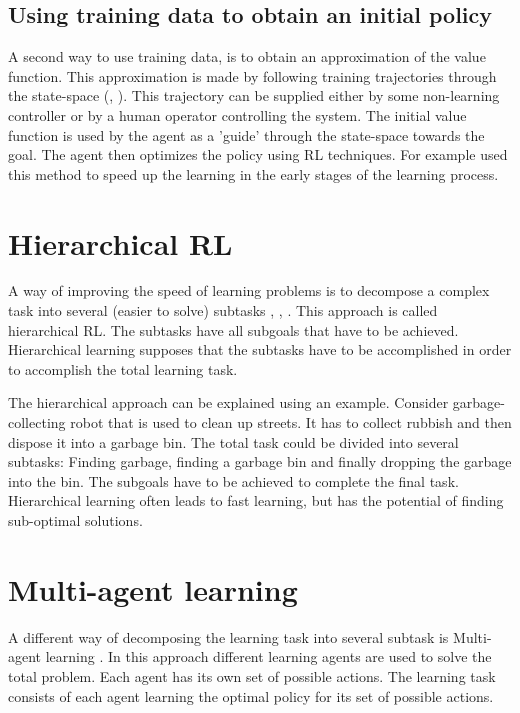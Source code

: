 \documentclass[a4paper,11pt]{mscLiterature}
\begin{document}
\subsection{Using training data to obtain an initial policy}
A second way to use training data, is to obtain an approximation of the value function. This approximation is made by following training trajectories through the state-space (\cite{AtkesonSchaal:97}, \cite{SmartKaelbling:00}). This trajectory can be supplied either by some non-learning controller or by a human operator controlling the system. The initial value function is used by the agent as a 'guide' through the state-space towards the goal. The agent then optimizes the policy using RL techniques. For example \cite{SmartKaelbling:00} used this method to speed up the learning in the early stages of the learning process.


\section{Hierarchical RL}
A way of improving the speed of learning problems is to decompose a complex task into several (easier to solve) subtasks \cite{Kaelbling:96}, \cite{BakkerSchmidhuber:04}, \cite{Schuitema:06}. This approach is called hierarchical RL. The subtasks have all subgoals that have to be achieved. Hierarchical learning supposes that the subtasks have to be accomplished in order to accomplish the total learning task. 

The hierarchical approach can be explained using an example. Consider garbage-collecting robot that is used to clean up streets. It has to collect rubbish and then dispose it into a garbage bin. The total task could be divided into several subtasks: Finding garbage, finding a garbage bin and finally dropping the garbage into the bin. The subgoals have to be achieved to complete the final task. Hierarchical learning often leads to fast learning, but has the potential of finding sub-optimal solutions.
	
\section{Multi-agent learning}
A different way of decomposing the learning task into several subtask is Multi-agent learning \cite{Boutilier:96}. In this approach different learning agents are used to solve the total problem. Each agent has its own set of possible actions. The learning task consists of each agent learning the optimal policy for its set of possible actions.
\end{document}
